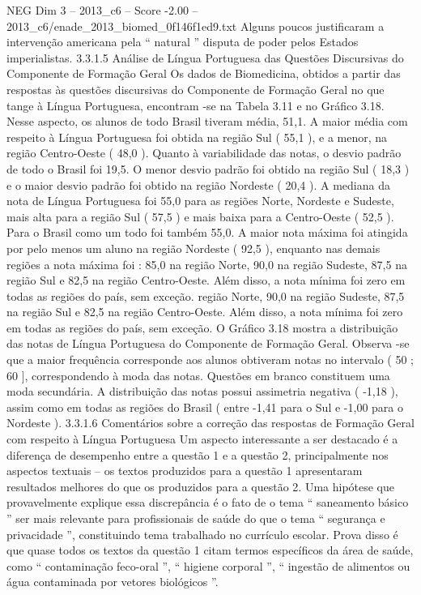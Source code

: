 \begin{textsample}{NEG Dim 3 – 2013\_c6 – Score -2.00 – 2013\_c6/enade\_2013\_biomed\_0f146f1ed9.txt}
Alguns poucos justificaram a intervenção americana pela “ natural ” disputa de poder pelos Estados imperialistas. 3.3.1.5 Análise de Língua Portuguesa das Questões Discursivas do Componente de Formação Geral Os dados de Biomedicina, obtidos a partir das respostas às questões discursivas do Componente de Formação Geral no que tange à Língua Portuguesa, encontram -se na Tabela 3.11 e no Gráfico 3.18.
Nesse aspecto, os alunos de todo Brasil tiveram média, 51,1.
A maior média com respeito à Língua Portuguesa foi obtida na região Sul ( 55,1 ), e a menor, na região Centro-Oeste ( 48,0 ).
Quanto à variabilidade das notas, o desvio padrão de todo o Brasil foi 19,5.
O menor desvio padrão foi obtido na região Sul ( 18,3 ) e o maior desvio padrão foi obtido na região Nordeste ( 20,4 ).
A mediana da nota de Língua Portuguesa foi 55,0 para as regiões Norte, Nordeste e Sudeste, mais alta para a região Sul ( 57,5 ) e mais baixa para a Centro-Oeste ( 52,5 ).
Para o Brasil como um todo foi também 55,0.
A maior nota máxima foi atingida por pelo menos um aluno na região Nordeste ( 92,5 ), enquanto nas demais regiões a nota máxima foi : 85,0 na região Norte, 90,0 na região Sudeste, 87,5 na região Sul e 82,5 na região Centro-Oeste.
Além disso, a nota mínima foi zero em todas as regiões do país, sem exceção. região Norte, 90,0 na região Sudeste, 87,5 na região Sul e 82,5 na região Centro-Oeste.
Além disso, a nota mínima foi zero em todas as regiões do país, sem exceção.
O Gráfico 3.18 mostra a distribuição das notas de Língua Portuguesa do Componente de Formação Geral.
Observa -se que a maior frequência corresponde aos alunos obtiveram notas no intervalo ( 50 ; 60 ], correspondendo à moda das notas.
Questões em branco constituem uma moda secundária.
A distribuição das notas possui assimetria negativa ( -1,18 ), assim como em todas as regiões do Brasil ( entre -1,41 para o Sul e -1,00 para o Nordeste ). 3.3.1.6 Comentários sobre a correção das respostas de Formação Geral com respeito à Língua Portuguesa Um aspecto interessante a ser destacado é a diferença de desempenho entre a questão 1 e a questão 2, principalmente nos aspectos textuais – os textos produzidos para a questão 1 apresentaram resultados melhores do que os produzidos para a questão 2.
Uma hipótese que provavelmente explique essa discrepância é o fato de o tema “ saneamento básico ” ser mais relevante para profissionais de saúde do que o tema “ segurança e privacidade ”, constituindo tema trabalhado no currículo escolar.
Prova disso é que quase todos os textos da questão 1 citam termos específicos da área de saúde, como “ contaminação feco-oral ”, “ higiene corporal ”, “ ingestão de alimentos ou água contaminada por vetores biológicos ”.

\end{textsample}
